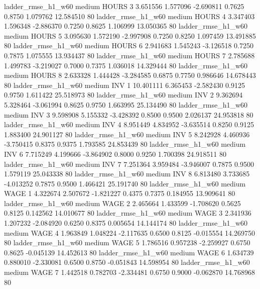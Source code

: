     ladder_rmse_h1_w60     medium    HOURS                 3  3.651556 1.577096 -2.690811 0.7625 0.8750  1.079762   12.584510 80
    ladder_rmse_h1_w60     medium    HOURS                 4  3.347403 1.596348 -2.886370 0.7250 0.8625  1.106999   13.050365 80
    ladder_rmse_h1_w60     medium    HOURS                 5  3.095630 1.572190 -2.997908 0.7250 0.8250  1.097459   13.491885 80
    ladder_rmse_h1_w60     medium    HOURS                 6  2.941683 1.545243 -3.126518 0.7250 0.7875  1.075555   13.934437 80
    ladder_rmse_h1_w60     medium    HOURS                 7  2.785688 1.499783 -3.219027 0.7000 0.7375  1.036018   14.329444 80
    ladder_rmse_h1_w60     medium    HOURS                 8  2.633328 1.444428 -3.284585 0.6875 0.7750  0.986646   14.678443 80
    ladder_rmse_h1_w60     medium      INV                 1 10.401111 6.365453 -2.582430 0.9125 0.9750  1.611422   25.518973 80
    ladder_rmse_h1_w60     medium      INV                 2  9.362694 5.328464 -3.061994 0.8625 0.9750  1.663995   25.134490 80
    ladder_rmse_h1_w60     medium      INV                 3  9.598908 5.155332 -3.428392 0.8500 0.9500  2.026137   24.953818 80
    ladder_rmse_h1_w60     medium      INV                 4  8.951449 4.834952 -3.635514 0.8250 0.9125  1.883400   24.901127 80
    ladder_rmse_h1_w60     medium      INV                 5  8.242928 4.460936 -3.750415 0.8375 0.9375  1.793585   24.853439 80
    ladder_rmse_h1_w60     medium      INV                 6  7.715249 4.199666 -3.864902 0.8000 0.9250  1.700398   24.918511 80
    ladder_rmse_h1_w60     medium      INV                 7  7.251364 3.959484 -3.946007 0.7875 0.9500  1.579119   25.043338 80
    ladder_rmse_h1_w60     medium      INV                 8  6.813480 3.733685 -4.013252 0.7875 0.9500  1.466421   25.191740 80
    ladder_rmse_h1_w60     medium     WAGE                 1  4.322674 2.507672 -1.821227 0.4375 0.7375  0.184955   13.909641 80
    ladder_rmse_h1_w60     medium     WAGE                 2  2.465664 1.433599 -1.708620 0.5625 0.8125  0.142562   14.010677 80
    ladder_rmse_h1_w60     medium     WAGE                 3  2.341936 1.207232 -2.084920 0.6250 0.8375  0.005654   14.144174 80
    ladder_rmse_h1_w60     medium     WAGE                 4  1.963849 1.048224 -2.117635 0.6500 0.8125 -0.015554   14.269750 80
    ladder_rmse_h1_w60     medium     WAGE                 5  1.786516 0.957238 -2.259927 0.6750 0.8625 -0.045139   14.452613 80
    ladder_rmse_h1_w60     medium     WAGE                 6  1.634739 0.880010 -2.330081 0.6500 0.8750 -0.051843   14.598954 80
    ladder_rmse_h1_w60     medium     WAGE                 7  1.442518 0.782703 -2.334481 0.6750 0.9000 -0.062870   14.768968 80
